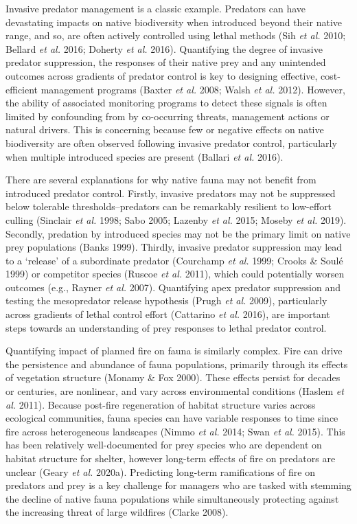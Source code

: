 \documentclass[11pt,a4paper,titlepage,twoside,openright]{style/unimelbthesis}
\begin{document}
\begin{mainmatter}
Invasive predator management is a classic example. Predators can have devastating impacts on native biodiversity when introduced beyond their native range, and so, are often actively controlled using lethal methods (Sih \emph{et al.} 2010; Bellard \emph{et al.} 2016; Doherty \emph{et al.} 2016). Quantifying the degree of invasive predator suppression, the responses of their native prey and any unintended outcomes across gradients of predator control is key to designing effective, cost-efficient management programs (Baxter \emph{et al.} 2008; Walsh \emph{et al.} 2012). However, the ability of associated monitoring programs to detect these signals is often limited by confounding from by co-occurring threats, management actions or natural drivers. This is concerning because few or negative effects on native biodiversity are often observed following invasive predator control, particularly when multiple introduced species are present (Ballari \emph{et al.} 2016).

There are several explanations for why native fauna may not benefit from introduced predator control. Firstly, invasive predators may not be suppressed below tolerable thresholds--predators can be remarkably resilient to low-effort culling (Sinclair \emph{et al.} 1998; Sabo 2005; Lazenby \emph{et al.} 2015; Moseby \emph{et al.} 2019). Secondly, predation by introduced species may not be the primary limit on native prey populations (Banks 1999). Thirdly, invasive predator suppression may lead to a `release' of a subordinate predator (Courchamp \emph{et al.} 1999; Crooks \& Soulé 1999) or competitor species (Ruscoe \emph{et al.} 2011), which could potentially worsen outcomes (e.g., Rayner \emph{et al.} 2007). Quantifying apex predator suppression and testing the mesopredator release hypothesis (Prugh \emph{et al.} 2009), particularly across gradients of lethal control effort (Cattarino \emph{et al.} 2016), are important steps towards an understanding of prey responses to lethal predator control.

Quantifying impact of planned fire on fauna is similarly complex. Fire can drive the persistence and abundance of fauna populations, primarily through its effects of vegetation structure (Monamy \& Fox 2000). These effects persist for decades or centuries, are nonlinear, and vary across environmental conditions (Haslem \emph{et al.} 2011). Because post-fire regeneration of habitat structure varies across ecological communities, fauna species can have variable responses to time since fire across heterogeneous landscapes (Nimmo \emph{et al.} 2014; Swan \emph{et al.} 2015). This has been relatively well-documented for prey species who are dependent on habitat structure for shelter, however long-term effects of fire on predators are unclear (Geary \emph{et al.} 2020a). Predicting long-term ramifications of fire on predators and prey is a key challenge for managers who are tasked with stemming the decline of native fauna populations while simultaneously protecting against the increasing threat of large wildfires (Clarke 2008).


\end{mainmatter}
\end{document}
